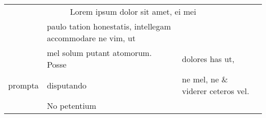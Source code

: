 \documentclass{article}
\begin{document}
\begin{table}[tbp]
  \begin{tabular}{llll}
\multicolumn{4}{c}{Lorem ipsum dolor sit amet, ei mei} \\
& paulo tation honestatis,
intellegam accommodare ne vim, ut \\
& mel solum putant atomorum. Posse & dolores has ut, \\
prompta & disputando & ne mel, ne
\& viderer ceteros vel. \\
& No petentium
  \end{tabular}
\end{table}
\end{document}
